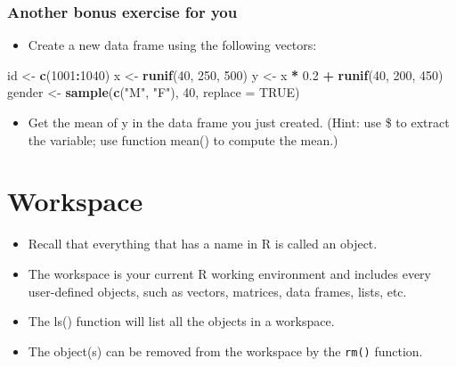 \documentclass[
]{book}
\newenvironment{Shaded}{\begin{snugshade}}{\end{snugshade}}
\newcommand{\AttributeTok}[1]{\textcolor[rgb]{0.13,0.29,0.53}{#1}}
\newcommand{\ConstantTok}[1]{\textcolor[rgb]{0.56,0.35,0.01}{#1}}
\newcommand{\DecValTok}[1]{\textcolor[rgb]{0.00,0.00,0.81}{#1}}
\newcommand{\FloatTok}[1]{\textcolor[rgb]{0.00,0.00,0.81}{#1}}
\newcommand{\FunctionTok}[1]{\textcolor[rgb]{0.13,0.29,0.53}{\textbf{#1}}}
\newcommand{\NormalTok}[1]{#1}
\newcommand{\OtherTok}[1]{\textcolor[rgb]{0.56,0.35,0.01}{#1}}
\newcommand{\SpecialCharTok}[1]{\textcolor[rgb]{0.81,0.36,0.00}{\textbf{#1}}}
\newcommand{\StringTok}[1]{\textcolor[rgb]{0.31,0.60,0.02}{#1}}
\providecommand{\tightlist}{%
  \setlength{\itemsep}{0pt}\setlength{\parskip}{0pt}}
\begin{document}
\subsubsection{Another bonus exercise for you}\label{another-bonus-exercise-for-you}

\begin{itemize}
\tightlist
\item
  Create a new data frame using the following vectors:
\end{itemize}

\begin{Shaded}
\begin{Highlighting}[]
\NormalTok{id }\OtherTok{\textless{}{-}} \FunctionTok{c}\NormalTok{(}\DecValTok{1001}\SpecialCharTok{:}\DecValTok{1040}\NormalTok{)}
\NormalTok{x }\OtherTok{\textless{}{-}} \FunctionTok{runif}\NormalTok{(}\DecValTok{40}\NormalTok{, }\DecValTok{250}\NormalTok{, }\DecValTok{500}\NormalTok{)}
\NormalTok{y }\OtherTok{\textless{}{-}}\NormalTok{ x }\SpecialCharTok{*} \FloatTok{0.2} \SpecialCharTok{+} \FunctionTok{runif}\NormalTok{(}\DecValTok{40}\NormalTok{, }\DecValTok{200}\NormalTok{, }\DecValTok{450}\NormalTok{)}
\NormalTok{gender }\OtherTok{\textless{}{-}} \FunctionTok{sample}\NormalTok{(}\FunctionTok{c}\NormalTok{(}\StringTok{"M"}\NormalTok{, }\StringTok{"F"}\NormalTok{), }\DecValTok{40}\NormalTok{, }\AttributeTok{replace =} \ConstantTok{TRUE}\NormalTok{)}
\end{Highlighting}
\end{Shaded}

\begin{itemize}
\tightlist
\item
  Get the mean of y in the data frame you just created. (Hint: use \$ to extract the variable; use function
  mean() to compute the mean.)
\end{itemize}

\section{Workspace}\label{workspace}

\begin{itemize}
\tightlist
\item
  Recall that everything that has a name in R is called an object.
\item
  The workspace is your current R working environment and includes every user-defined objects, such as vectors, matrices, data frames, lists, etc.
\item
  The ls() function will list all the objects in a workspace.
\item
  The object(s) can be removed from the workspace by the \texttt{rm()} function.
\end{itemize}
\end{document}
